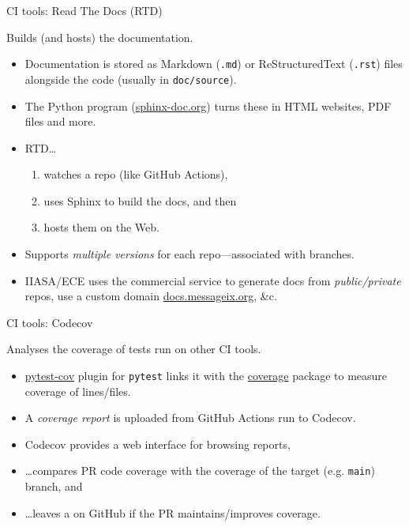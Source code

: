 \documentclass[12pt,aspectratio=169]{beamer}
\begin{document}
\begin{frame}{CI tools: Read The Docs (RTD)}

  {\Large Builds (and hosts) the documentation.}

  \bigskip
  \begin{itemize}
    \item Documentation is stored as Markdown (\texttt{.md}) or ReStructuredText (\texttt{.rst}) files alongside the code (usually in \texttt{doc/source}).
    \item The Python program  (\href{https://www.sphinx-doc.org}{sphinx-doc.org}) turns these in HTML websites, PDF files and more.
    \item RTD…
          \begin{enumerate}
            \item watches a repo (like GitHub Actions),
            \item uses Sphinx to build the docs, and then
            \item hosts them on the Web.
          \end{enumerate}
    \item Supports \emph{multiple versions} for each repo—associated with branches.
    \item IIASA/ECE uses the commercial service to generate docs from \emph{public/private} repos, use a custom domain \href{https://docs.messageix.org}{docs.messageix.org}, \&c.
  \end{itemize}

\end{frame}

\begin{frame}{CI tools: Codecov}

  {\Large Analyses the coverage of tests run on other CI tools.}

  \bigskip
  \begin{itemize}
    \item \href{https://pytest-cov.readthedocs.io}{\ttfamily pytest-cov} plugin for \texttt{pytest} links it with the \href{https://github.com/nedbat/coveragepy}{\ttfamily coverage} package to measure coverage of lines/files.
    \item A \emph{coverage report} is uploaded from GitHub Actions run to Codecov.
    \item Codecov provides a web interface for browsing reports,
    \item …compares PR code coverage with the coverage of the target (e.g. \texttt{main}) branch, and
    \item …leaves a  on GitHub if the PR maintains/improves coverage.
  \end{itemize}

\end{frame}
\end{document}
